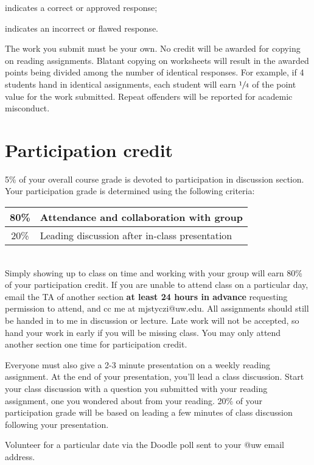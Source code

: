 \documentclass[12pt,letterpaper]{article}
\newcommand{\ch}{{\ding{51}}}        %
\newcommand{\X}{{\ding{55}}}        %
\begin{document}
	{\ch} indicates a correct or approved response;
	
	{\X} indicates an incorrect or flawed response.
	
	The work you submit must be your own. No credit will be awarded for copying on reading assignments. Blatant copying on worksheets will result in the awarded points being divided among the number of identical responses. For example, if 4 students hand in identical assignments, each student will earn $\sfrac{1}{4}$ of the point value for the work submitted. Repeat offenders will be reported for academic misconduct.

\section{Participation credit}
	5\% of your overall course grade is devoted to participation in discussion section. Your participation grade is determined using the following criteria:\\

	\begin{tabular}{ | c | l | }
		\hline
		80\%	&	Attendance and collaboration with group\\
		\hline
		20\%	&	Leading discussion after in-class presentation\\
		\hline
	\end{tabular}\\
	
Simply showing up to class on time and working with your group will earn 80\% of your participation credit. If you are unable to attend class on a particular day, email the TA of another section \textbf{at least 24 hours in advance} requesting permission to attend, and cc me at \mbox{mjstyczi@uw.edu}. All assignments should still be handed in to me in discussion or lecture. Late work will not be accepted, so hand your work in early if you will be missing class. You may only attend another section one time for participation credit.

Everyone must also give a 2-3 minute presentation on a weekly reading assignment. At the end of your presentation, you'll lead a class discussion. Start your class discussion with a question you submitted with your reading assignment, one you wondered about from your reading. 20\% of your participation grade will be based on leading a few minutes of class discussion following your presentation.

Volunteer for a particular date via the Doodle poll sent to your @uw email address.\\[-2mm]


\thispagestyle{empty}
\end{document}
